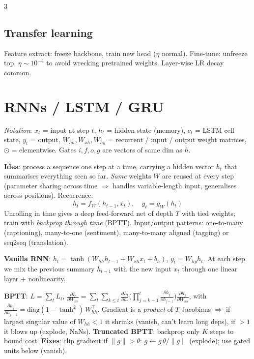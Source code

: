 \documentclass[a4paper,9pt,landscape]{scrartcl}
\newcommand{\dd}[2]{\frac{\partial #1}{\partial #2}}
\begin{document}
\begin{multicols*}{3}
\subsection{Transfer learning}
Feature extract: freeze backbone, train new head ($\eta$ normal). Fine-tune: unfreeze top, $\eta{\sim}10^{-4}$ to avoid wrecking pretrained weights. Layer-wise LR decay common.

\section{RNNs / LSTM / GRU}
\textit{Notation}: $x_t$ = input at step $t$, $h_t$ = hidden state (memory), $c_t$ = LSTM cell state, $y_t$ = output, $W_{hh},W_{xh},W_{hy}$ = recurrent / input / output weight matrices, $\odot$ = elementwise. Gates $i,f,o,g$ are vectors of same dim as $h$.

\textbf{Idea}: process a sequence one step at a time, carrying a hidden vector $h_t$ that summarises everything seen so far. \emph{Same} weights $W$ are reused at every step (parameter sharing across time $\Rightarrow$ handles variable-length input, generalises across positions). Recurrence:
$$h_t=f_W(h_{t-1},x_t),\quad y_t=g_W(h_t)$$
Unrolling in time gives a deep feed-forward net of depth $T$ with tied weights; train with \emph{backprop through time} (BPTT). Input/output patterns: one-to-many (captioning), many-to-one (sentiment), many-to-many aligned (tagging) or seq2seq (translation).

\textbf{Vanilla RNN}: $h_t=\tanh(W_{hh}h_{t-1}+W_{xh}x_t+b_h)$,\; $y_t=W_{hy}h_t$.
At each step we mix the previous summary $h_{t-1}$ with the new input $x_t$ through one linear layer + nonlinearity.

\textbf{BPTT}: $L=\sum_t L_t$, $\dd{L}{W_{hh}}=\sum_t\sum_{k\le t}\dd{L_t}{h_t}\!\Big(\!\prod_{j=k+1}^t\dd{h_j}{h_{j-1}}\Big)\dd{h_k}{W_{hh}}$, with $\dd{h_j}{h_{j-1}}{=}\mathrm{diag}(1{-}\tanh^2)\,W_{hh}^\top$.
Gradient is a \emph{product} of $T$ Jacobians $\Rightarrow$ if largest singular value of $W_{hh}<1$ it shrinks (vanish, can't learn long deps), if $>1$ it blows up (explode, NaNs). \textbf{Truncated BPTT}: backprop only $K$ steps to bound cost.
\textbf{Fixes}: clip gradient if $\|g\|>\theta$: $g\leftarrow g\,\theta/\|g\|$ (explode); use gated units below (vanish).


\end{multicols*}
\end{document}
